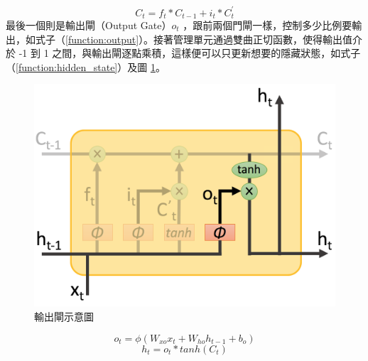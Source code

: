 \begin{equation}
    C_t = f_t * C_{t-1} + i_t * C_t^{'} \label{function:update}
\end{equation}
最後一個則是輸出閘（Output Gate）$o_t$ ，跟前兩個門閘一樣，控制多少比例要輸出，如式子（\ref{function:output}）。接著管理單元通過雙曲正切函數，使得輸出值介於 -1 到 1 之間，與輸出閘逐點乘積，這樣便可以只更新想要的隱藏狀態，如式子（\ref{function:hidden_state}）及圖 \ref{fig:output_gate}。
\begin{figure}[h]
    \centering
    \includegraphics[scale=0.35]{images/chap2_output.png}
    \caption{輸出閘示意圖}\label{fig:output_gate}
\end{figure}
\begin{equation}
    o_t =  \phi(W_{xo}x_t + W_{ho}h_{t-1} + b_o) \label{function:output}
\end{equation}
\begin{equation}
    h_t = o_t * tanh(C_t) \label{function:hidden_state}
\end{equation}

